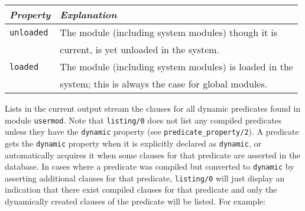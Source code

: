 \begin{description}
    \begin{center}
    \begin{tabular}{||l|l||}               \hline 
	{\em Property}		& {\em Explanation} \\ \hline \hline
	{\tt unloaded}		& 
		The module (including system modules) though it is \\
	&	current, is yet unloaded in the system. \\ \hline
	{\tt loaded}		& 
		The module (including system modules) is loaded in the \\
	&	system; this is always the case for global modules.\\ \hline
    \end{tabular}
    \end{center}

    Lists in the current output stream the clauses for all dynamic
    predicates found in module {\tt usermod}.  Note that {\tt listing/0}
    does not list any compiled predicates unless they have the
    {\tt dynamic} property (see {\tt predicate\_property/2}).  A
    predicate gets the {\tt dynamic} property when it is explicitly
    declared as {\tt dynamic}, or automatically acquires it when some
    clauses for that predicate are asserted in the database.  In
    cases where a predicate was compiled but converted to {\tt dynamic}
    by asserting additional clauses for that predicate, {\tt listing/0}
    will just display an indication that there exist compiled clauses
    for that predicate and only the dynamically created clauses of the
    predicate will be listed.  For example:



\end{description}
